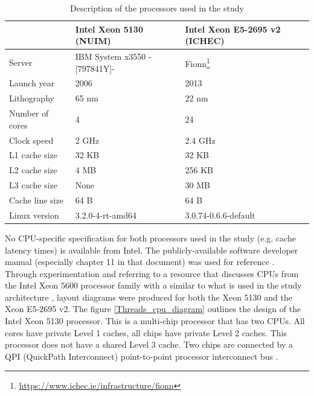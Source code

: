 \begin{table}
\caption{Description of the processors used in the study}
\centering 
\begin{tabular}{lll}
\hline
                & \textbf{Intel Xeon 5130 (NUIM)} & \textbf{Intel Xeon E5-2695 v2 (ICHEC)} \\ \hline
Server          & IBM System x3550 -[797841Y]-                     & Fionn\footnote{\url{https://www.ichec.ie/infrastructure/fionn}}                       \\
Launch year     & 2006                       & 2013                             \\
Lithography     & 65 nm                      & 22 nm                            \\
Number of cores & 4                          & 24                               \\
Clock speed     & 2 GHz                      & 2.4 GHz                          \\
L1 cache size   & 32 KB                      & 32 KB                            \\
L2 cache size   & 4 MB                    & 256 KB                           \\
L3 cache size   & None                       & 30 MB \\
Cache line size   & 64 B                       & 64 B \\
Linux version   & 3.2.0-4-rt-amd64           & 3.0.74-0.6.6-default
\end{tabular}
\label{xeonTable}
\end{table}

No CPU-specific specification for both processors used in the study (e.g. cache latency times) is available from Intel. The publicly-available software developer manual (especially chapter 11 in that document) was used for reference \cite{Intel2014}. Through experimentation and referring to a resource that discusses CPUs from the Intel Xeon 5600 processor family with a similar to what is used in the study architecture \cite{Balakrishnan2010}, layout diagrams were produced for both the Xeon 5130 and the Xeon E5-2695 v2. The figure \ref{Threads_cpu_diagram} outlines the design of the Intel Xeon 5130 processor. This is a multi-chip processor that has two CPUs. All cores have private Level 1 caches, all chips have private Level 2 caches. This processor does not have a shared Level 3 cache. Two chips are connected by a QPI (QuickPath Interconnect) point-to-point processor interconnect bus \cite{Intel2009a}.

